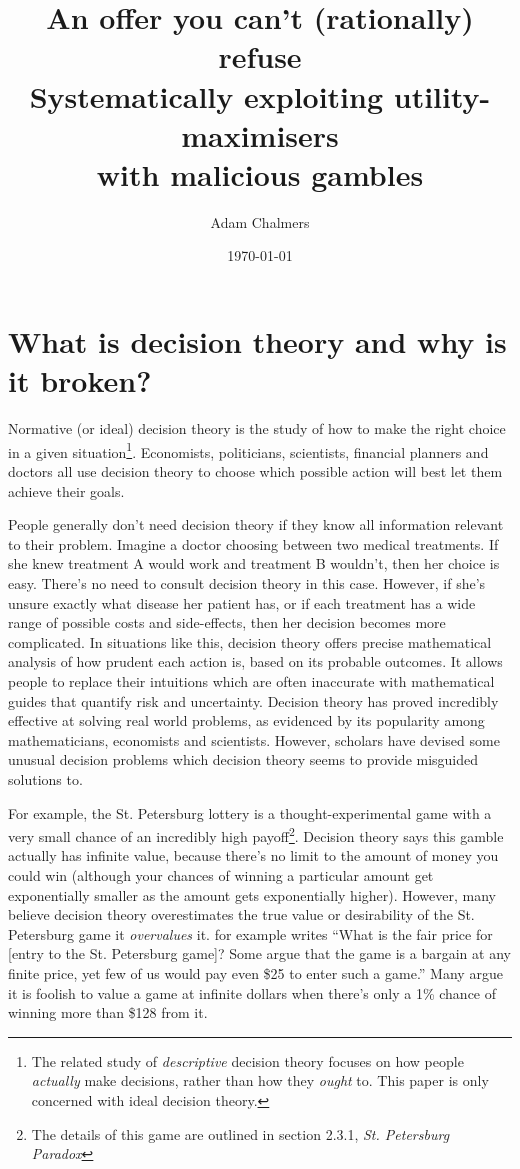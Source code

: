 \documentclass{article}
\title{%
  An offer you can't (rationally) refuse \\
  \large Systematically exploiting utility-maximisers \\
    with malicious gambles}
\author{Adam Chalmers}
\date{\today}
\begin{document}
\frenchspacing
\doublespacing
\maketitle

\tableofcontents

\newpage\section{What is decision theory and why is it broken?}

Normative (or ideal) decision theory is the study of how to make the right choice in a given situation\footnote{The related study of \textit{descriptive} decision theory focuses on how people \textit{actually} make decisions, rather than how they \textit{ought} to. This paper is only concerned with ideal decision theory.}. Economists, politicians, scientists, financial planners and doctors all use decision theory to choose which possible action will best let them achieve their goals.

People generally don't need decision theory if they know all information relevant to their problem. Imagine a doctor choosing between two medical treatments. If she knew treatment A would work and treatment B wouldn't, then her choice is easy. There's no need to consult decision theory in this case. However, if she's unsure exactly what disease her patient has, or if each treatment has a wide range of possible costs and side-effects, then her decision becomes more complicated. In situations like this, decision theory offers precise mathematical analysis of how prudent each action is, based on its probable outcomes. It allows people to replace their intuitions \textemdash{} which are often inaccurate \textemdash{} with mathematical guides that quantify risk and uncertainty. Decision theory has proved incredibly effective at solving real world problems, as evidenced by its popularity among mathematicians, economists and scientists. However, scholars have devised some unusual decision problems which decision theory seems to provide misguided solutions to. 

For example, the St. Petersburg lottery is a thought-experimental game with a very small chance of an incredibly high payoff\footnote{The details of this game are outlined in section 2.3.1, \textit{St. Petersburg Paradox}}. Decision theory says this gamble actually has infinite value, because there's no limit to the amount of money you could win (although your chances of winning a particular amount get exponentially smaller as the amount gets exponentially higher). However, many believe decision theory overestimates the true value or desirability of the St. Petersburg game \textemdash{} it \textit{overvalues} it. \citep{hacking1980strange} for example writes ``What is the fair price for [entry to the St. Petersburg game]? Some argue that the game is a bargain at any finite price, yet few of us would pay even \$25 to enter such a game.'' Many argue it is foolish to value a game at infinite dollars when there's only a 1\% chance of winning more than \$128 from it.
\end{document}
